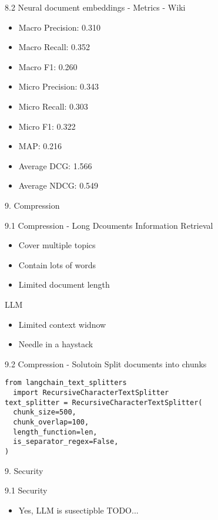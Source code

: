 \documentclass{beamer}
\begin{document}
\begin{frame}{8.2 Neural document embeddings - Metrics - Wiki}
  \begin{itemize}
    \item Macro Precision: 0.310
    \item Macro Recall: 0.352
    \item Macro F1: 0.260
    \item Micro Precision: 0.343
    \item Micro Recall: 0.303
    \item Micro F1: 0.322
    \item MAP: 0.216
    \item Average DCG: 1.566
    \item Average NDCG: 0.549
  \end{itemize}
\end{frame}

\begin{frame}{9. Compression}
\end{frame}

\begin{frame}{9.1 Compression - Long Dcouments}
  Information Retrieval
  \begin{itemize}
    \item Cover multiple topics
    \item Contain lots of words
    \item Limited document length
  \end{itemize}
  LLM
  \begin{itemize}
    \item Limited context widnow
    \item Needle in a haystack
  \end{itemize}
\end{frame}

\begin{frame}[fragile]{9.2 Compression - Solutoin}
Split documents into chunks
\begin{verbatim}
from langchain_text_splitters
  import RecursiveCharacterTextSplitter
text_splitter = RecursiveCharacterTextSplitter(
  chunk_size=500,
  chunk_overlap=100,
  length_function=len,
  is_separator_regex=False,
)
\end{verbatim}
\end{frame}

\begin{frame}{9. Security}
\end{frame}

\begin{frame}{9.1 Security}
  \begin{itemize}
    \item Yes, LLM is susectipble TODO...
  \end{itemize}
\end{frame}
\end{document}
